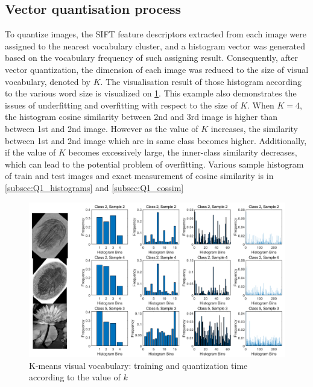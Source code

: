 \subsection{Vector quantisation process}
 To quantize images, the SIFT feature descriptors extracted from each image were assigned to the nearest vocabulary cluster, and a histogram vector was generated based on the vocabulary frequency of such assigning result. Consequently, after vector quantization, the dimension of each image was reduced to the size of visual vocabulary, denoted by $K$. The visualisation result of those histogram according to the various word size is visualized on \cref{fig:q1-fig2}. This example also demonstrates the issues of underfitting and overfitting with respect to the size of $K$. When $K=4$, the histogram cosine similarity between 2nd and 3rd image is higher than between 1st and 2nd image. However as the value of $K$ increases, the similarity between 1st and 2nd image which are in same class becomes higher. Additionally, if the value of $K$ becomes excessively large, the inner-class similarity decreases, which can lead to the potential problem of overfitting. Various sample histogram of train and test images and exact measurement of cosine similarity is in \cref{subsec:Q1_histograms} and \cref{subsec:Q1_cossim}
 
 \begin{figure}
 	\centering
 	\includegraphics[width=0.5\linewidth]{image/q1-fig2.png}
 	\caption{K-means visual vocabulary: training and quantization time according to the value of $k$}
 	\label{fig:q1-fig2}
 \end{figure}
 